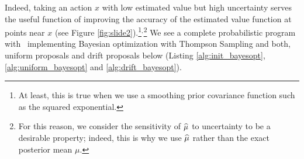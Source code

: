 Indeed, taking an action $x$ with low estimated value but high uncertainty
serves the useful function of improving the accuracy of the estimated value
function at points near $x$ (see Figure \ref{fig:slide2}).\footnote{
  At least, this is true when we use a smoothing prior covariance function such
  as the squared exponential.
}$^,$\footnote{
  For this reason, we consider the sensitivity of $\widehat{\mu}$ to uncertainty to be
  a desirable property; indeed, this is why we use $\widehat{\mu}$ rather than the
  exact posterior mean $\mu$.
}
We see a complete probabilistic program with \gpmem\ implementing Bayesian optimization
with Thompson Sampling and both, uniform proposals and drift proposals below
(Listing \ref{alg:init_bayesopt},\ref{alg:uniform_bayesopt} and \ref{alg:drift_bayesopt}).
 
 
 
